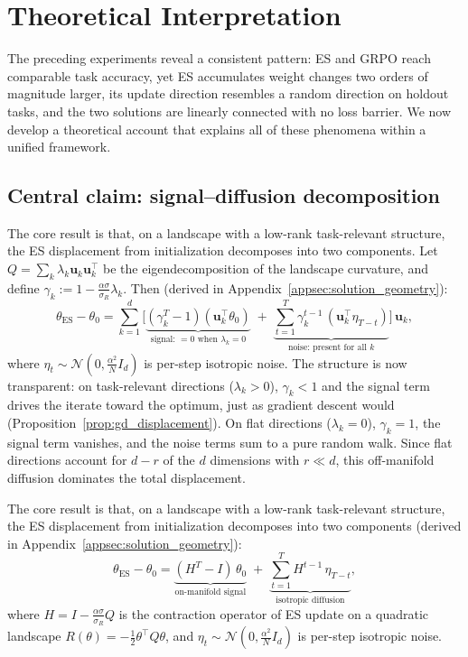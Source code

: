 
\section{Theoretical Interpretation}
\label{sec:theory}
The preceding experiments reveal a consistent pattern: ES and GRPO reach comparable task accuracy, yet ES accumulates weight changes two orders of magnitude larger, its update direction resembles a random direction on holdout tasks, and the two solutions are linearly connected with no loss barrier. We now develop a theoretical account that explains all of these phenomena within a unified framework.

\subsection{Central claim: signal--diffusion decomposition}

The core result is that, on a landscape with a low-rank task-relevant structure, the ES displacement from initialization decomposes into two components. Let $Q = \sum_k \lambda_k \mathbf{u}_k\mathbf{u}_k^\top$ be the eigendecomposition of the landscape curvature, and define $\gamma_k := 1 - \frac{\alpha\sigma}{\sigma_R}\lambda_k$. Then (derived in Appendix~\ref{appsec:solution_geometry}):
\begin{equation}\label{eq:es_decomposition}
    \theta_{\mathrm{ES}} - \theta_0
    = \sum_{k=1}^{d}\Big[
    \underbrace{(\gamma_k^T - 1)(\mathbf{u}_k^\top\theta_0)}_{\text{signal: } = 0 \text{ when } \lambda_k = 0}
    \;+\; \underbrace{\textstyle\sum_{t=1}^{T}\gamma_k^{t-1}\,(\mathbf{u}_k^\top\eta_{T-t})}_{\text{noise: present for all } k}
    \Big]\,\mathbf{u}_k,
\end{equation}
where $\eta_t \sim \mathcal{N}(0, \frac{\alpha^2}{N}I_d)$ is per-step isotropic noise. The structure is now transparent: on task-relevant directions ($\lambda_k > 0$), $\gamma_k < 1$ and the signal term drives the iterate toward the optimum, just as gradient descent would (Proposition~\ref{prop:gd_displacement}). On flat directions ($\lambda_k = 0$), $\gamma_k = 1$, the signal term vanishes, and the noise terms sum to a pure random walk. Since flat directions account for $d - r$ of the $d$ dimensions with $r \ll d$, this off-manifold diffusion dominates the total displacement.

The core result is that, on a landscape with a low-rank task-relevant structure, the ES displacement from initialization decomposes into two components (derived in Appendix~\ref{appsec:solution_geometry}):
\begin{equation}\label{eq:es_decomposition}
    \theta_{\mathrm{ES}} - \theta_0
    = \underbrace{(H^T - I)\,\theta_0}_{\text{on-manifold signal}}
    \;+\; \underbrace{\sum_{t=1}^{T}H^{t-1}\,\eta_{T-t}}_{\text{isotropic diffusion}},
\end{equation}
where $H = I - \frac{\alpha\sigma}{\sigma_R}Q$ is the contraction operator of ES update on a quadratic landscape $R(\theta) = -\frac{1}{2}\theta^\top Q\theta$, and $\eta_t \sim \mathcal{N}(0, \frac{\alpha^2}{N}I_d)$ is per-step isotropic noise.

